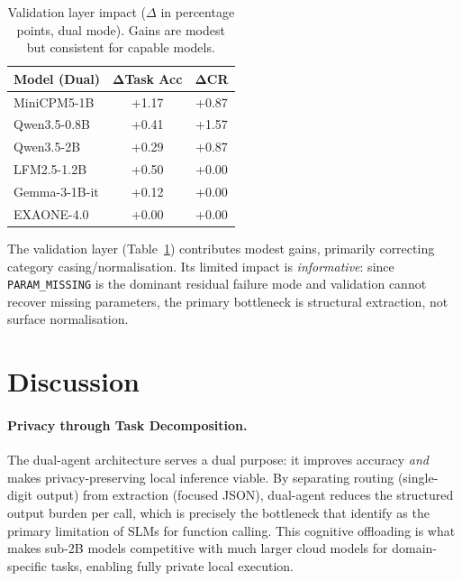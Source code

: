 \documentclass[11pt,twocolumn]{article}
\begin{document}
\begin{table}[t]
\centering
\small
\begin{tabular}{@{}lcc@{}}
\toprule
\textbf{Model (Dual)} & $\boldsymbol{\Delta}$\textbf{Task Acc} & $\boldsymbol{\Delta}$\textbf{CR} \\
\midrule
MiniCPM5-1B    & +1.17 & +0.87 \\
Qwen3.5-0.8B  & +0.41 & +1.57 \\
Qwen3.5-2B    & +0.29 & +0.87 \\
LFM2.5-1.2B   & +0.50 & +0.00 \\
Gemma-3-1B-it & +0.12 & +0.00 \\
EXAONE-4.0    & +0.00 & +0.00 \\
\bottomrule
\end{tabular}
\caption{Validation layer impact ($\Delta$ in percentage points, dual mode). Gains are modest but consistent for capable models.}
\label{tab:validation}
\end{table}

The validation layer (Table~\ref{tab:validation}) contributes modest gains, primarily correcting category casing/normalisation.
Its limited impact is \emph{informative}: since \texttt{PARAM\_MISSING} is the dominant residual failure mode and validation cannot recover missing parameters, the primary bottleneck is structural extraction, not surface normalisation.

\section{Discussion}
\label{sec:discussion}

\paragraph{Privacy through Task Decomposition.}
The dual-agent architecture serves a dual purpose: it improves accuracy \emph{and} makes privacy-preserving local inference viable.
By separating routing (single-digit output) from extraction (focused JSON), dual-agent reduces the structured output burden per call, which is precisely the bottleneck that \citet{kavathekar2025small} identify as the primary limitation of SLMs for function calling.
This cognitive offloading is what makes sub-2B models competitive with much larger cloud models for domain-specific tasks, enabling fully private local execution.
\end{document}
